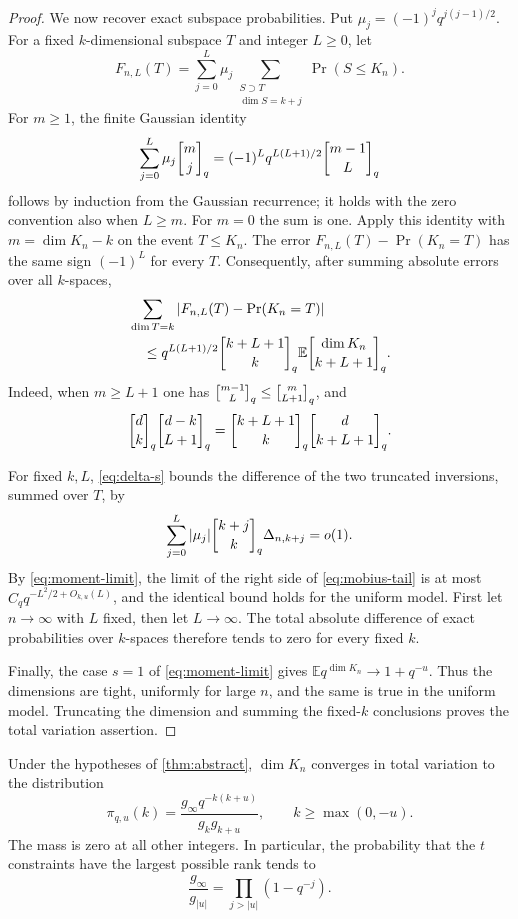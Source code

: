 \begin{proof}
We now recover exact subspace probabilities. Put
$\mu_j=(-1)^jq^{j(j-1)/2}$. For a fixed $k$-dimensional subspace $T$ and
integer $L\ge0$, let
\[
 F_{n,L}(T)=\sum_{j=0}^{L}\mu_j
       \sum_{\substack{S\supset T\\\dim S=k+j}}\Pr(S\le K_n).
\]
For $m\ge1$, the finite Gaussian identity
\begin{equation}\label{eq:partial-mobius}
 \sum_{j=0}^{L}\mu_j\qbinom mj
 =(-1)^Lq^{L(L+1)/2}\qbinom{m-1}{L}
\end{equation}
follows by induction from the Gaussian recurrence; it holds with the
zero convention also when $L\ge m$. For $m=0$ the sum is one.
Apply this identity with $m=\dim K_n-k$ on the event $T\le K_n$.
The error $F_{n,L}(T)-\Pr(K_n=T)$ has the same sign $(-1)^L$ for every $T$.
Consequently, after summing absolute errors over all $k$-spaces,
\begin{align}
 &\sum_{\dim T=k}|F_{n,L}(T)-\Pr(K_n=T)|\notag\\
 &\quad\le q^{L(L+1)/2}\qbinom{k+L+1}{k}
       \mathbb E\qbinom{\dim K_n}{k+L+1}.
       \label{eq:mobius-tail}
\end{align}
Indeed, when $m\ge L+1$ one has
$\qbinom{m-1}{L}\le\qbinom m{L+1}$, and
\[
 \qbinom dk\qbinom{d-k}{L+1}
 =\qbinom{k+L+1}{k}\qbinom d{k+L+1}.
\]

For fixed $k,L$, \eqref{eq:delta-s} bounds the difference of the two
truncated inversions, summed over $T$, by
\[
 \sum_{j=0}^{L}|\mu_j|\qbinom{k+j}{k}\Delta_{n,k+j}=o(1).
\]
By \eqref{eq:moment-limit}, the limit of the right side of
\eqref{eq:mobius-tail} is at most
$C_q q^{-L^2/2+O_{k,u}(L)}$, and the identical bound holds for the uniform
model. First let $n\to\infty$ with $L$ fixed, then let $L\to\infty$.
The total absolute difference of exact probabilities over $k$-spaces
therefore tends to zero for every fixed $k$.

Finally, the case $s=1$ of \eqref{eq:moment-limit} gives
$\mathbb E q^{\dim K_n}\to1+q^{-u}$. Thus the dimensions are tight,
uniformly for large $n$, and the same is true in the uniform model.
Truncating the dimension and summing the fixed-$k$ conclusions proves
the total variation assertion.
\end{proof}

\begin{corollary}\label{cor:nullity}
Under the hypotheses of \cref{thm:abstract}, $\dim K_n$ converges in total
variation to the distribution
\begin{equation}\label{eq:pi}
 \pi_{q,u}(k)=
 \frac{g_\infty q^{-k(k+u)}}{g_k g_{k+u}},
 \qquad k\ge\max(0,-u).
\end{equation}
The mass is zero at all other integers. In particular, the probability
that the $t$ constraints have the largest possible rank tends to
\begin{equation}\label{eq:full-rank}
 \frac{g_\infty}{g_{|u|}}=\prod_{j>|u|}(1-q^{-j}).
\end{equation}
\end{corollary}

